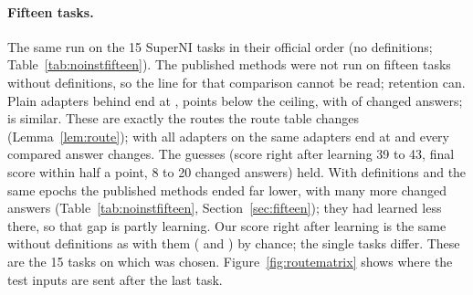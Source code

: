 \begin{table}[t]
  \caption{The five tasks without definitions, means over \AudSeedsN{} seeds (42, 43, 44), re-test, 10 epochs. Final score with the lowest and highest seed; answers changed summed over the seeds. The route table of our rows is the same in every seed. Other columns as in Table~\ref{tab:noinstpublished}.}
  \label{tab:noinstseeds}
  \centering
  
\end{table}

\begin{table}[t]
  \caption{Routes of the rules used in the GPU run, for the five-task sequence (500 test inputs, 400 of the first four tasks compared) and for the 15 SuperNI tasks: test inputs not at their own task after the last task; routes changed between arrival and the end, of those compared; audit $H/m$ and 95\% bound (Proposition~\ref{prop:audit}, averaged over all tasks of the sequence), where valid. The last row of each part sends every input to its own task.}
  \label{tab:routesgpu}
  \centering
  
\end{table}

\paragraph{Fifteen tasks.} The same run on the 15 SuperNI tasks in their official order (no definitions; Table~\ref{tab:noinstfifteen}). The published methods were not run on fifteen tasks without definitions, so the line for that comparison cannot be read; retention can. Plain adapters behind \recog{} end at \AudFifteenNoDefRidgeAP{}, \AudFifteenNoDefRidgeBelowOwn{} points below the ceiling, with \AudFifteenNoDefRidgeChanged{} of \AudFifteenNoDefCompared{} changed answers; \handicap{} is similar. These are exactly the routes the route table changes (Lemma~\ref{lem:route}); with all adapters on the same adapters end at \AudFifteenNoDefPlainAP{} and every compared answer changes.
The guesses (score right after learning 39 to 43, final score within half a point, 8 to 20 changed answers) held. With definitions and the same epochs the published methods ended far lower, with many more changed answers (Table~\ref{tab:noinstfifteen}, Section~\ref{sec:fifteen}); they had learned less there, so that gap is partly learning. Our score right after learning is the same without definitions as with them (\AudFifteenNoDefOwnLearned{} and \AudFifteenDefCertLearned{}) by chance; the single tasks differ. These are the 15 tasks on which \recog{} was chosen. Figure~\ref{fig:routematrix} shows where the test inputs are sent after the last task.

